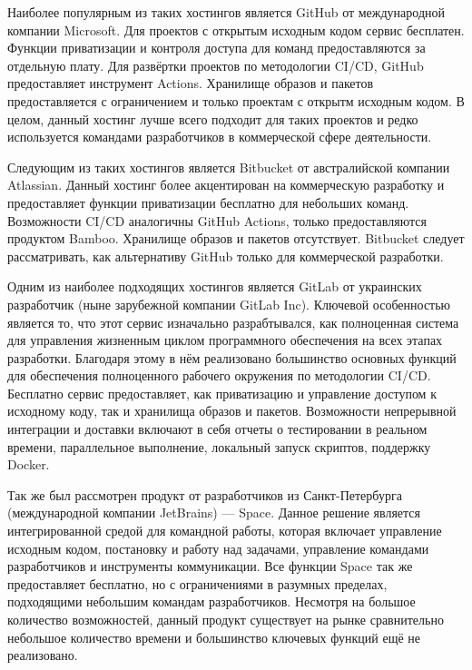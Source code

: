 Наиболее популярным из таких хостингов является GitHub от международной компании Microsoft.
Для проектов с открытым исходным кодом сервис бесплатен.
Функции приватизации и контроля доступа для команд предоставляются за отдельную плату.
Для развёртки проектов по методологии CI/CD, GitHub предоставляет инструмент Actions.
Хранилище образов и пакетов предоставляется с ограничением и только проектам с открытм исходным кодом.
В целом, данный хостинг лучше всего подходит для таких проектов и редко используется командами разработчиков в коммерческой сфере деятельности.

Следующим из таких хостингов является Bitbucket от австралийской компании Atlassian.
Данный хостинг более акцентирован на коммерческую разработку и предоставляет функции приватизации бесплатно для небольших команд.
Возможности CI/CD аналогичны GitHub Actions, только предоставляются продуктом Bamboo.
Хранилище образов и пакетов отсутствует.
Bitbucket следует рассматривать, как альтернативу GitHub только для коммерческой разработки.

Одним из наиболее подходящих хостингов является GitLab от украинских разработчик (ныне зарубежной компании GitLab Inc).
Ключевой особенностью является то, что этот сервис изначально разрабтывался,
как полноценная система для управления жизненным циклом программного обеспечения на всех этапах разработки.
Благодаря этому в нём реализовано большинство основных функций для обеспечения полноценного рабочего окружения по методологии CI/CD.
Бесплатно сервис предоставляет, как приватизацию и управление доступом к исходному коду, так и хранилища образов и пакетов.
Возможности непрерывной интеграции и доставки включают в себя отчеты о тестировании в реальном времени, параллельное выполнение, локальный запуск скриптов, поддержку Docker.

Так же был рассмотрен продукт от разработчиков из Санкт-Петербурга (международной компании JetBrains) --- Space.
Данное решение является интегрированной средой для командной работы, которая включает управление исходным кодом, постановку и работу над задачами, управление командами разработчиков и инструменты коммуникации.
Все функции Space так же предоставляет бесплатно, но с ограничениями в разумных пределах, подходящими небольшим командам разработчиков.
Несмотря на большое количество возможностей, данный продукт существует на рынке сравнительно небольшое количество времени и большинство ключевых функций ещё не реализовано.

